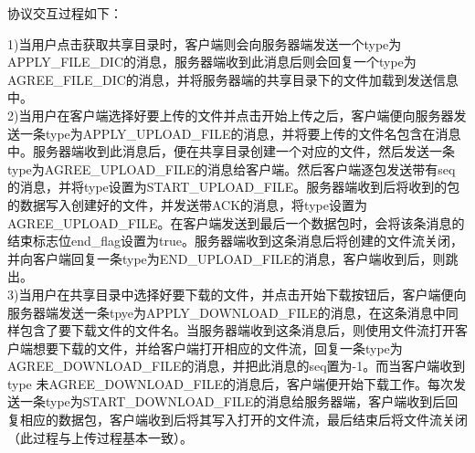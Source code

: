 协议交互过程如下：

\begin{flushleft}
1)当用户点击获取共享目录时，客户端则会向服务器端发送一个type为APPLY\_FILE\_DIC的消息，服务器端收到此消息后则会回复一个type为AGREE\_FILE\_DIC的消息，并将服务器端的共享目录下的文件加载到发送信息中。\\

2)当用户在客户端选择好要上传的文件并点击开始上传之后，客户端便向服务器发送一条type为APPLY\_UPLOAD\_FILE的消息，并将要上传的文件名包含在消息中。服务器端收到此消息后，便在共享目录创建一个对应的文件，然后发送一条type为AGREE\_UPLOAD\_FILE的消息给客户端。然后客户端逐包发送带有seq的消息，并将type设置为START\_UPLOAD\_FILE。服务器端收到后将收到的包的数据写入创建好的文件，并发送带ACK的消息，将type设置为AGREE\_UPLOAD\_FILE。在客户端发送到最后一个数据包时，会将该条消息的结束标志位end\_flag设置为true。服务器端收到这条消息后将创建的文件流关闭，并向客户端回复一条type为END\_UPLOAD\_FILE的消息，客户端收到后，则跳出。\\


3)当用户在共享目录中选择好要下载的文件，并点击开始下载按钮后，客户端便向服务器端发送一条tpye为APPLY\_DOWNLOAD\_FILE的消息，在这条消息中同样包含了要下载文件的文件名。当服务器端收到这条消息后，则使用文件流打开客户端想要下载的文件，并给客户端打开相应的文件流，回复一条type为AGREE\_DOWNLOAD\_FILE的消息，并把此消息的seq置为-1。而当客户端收到type 未AGREE\_DOWNLOAD\_FILE的消息后，客户端便开始下载工作。每次发送一条type为START\_DOWNLOAD\_FILE的消息给服务器端，客户端收到后回复相应的数据包，客户端收到后将其写入打开的文件流，最后结束后将文件流关闭（此过程与上传过程基本一致）。



\end{flushleft}

\clearpage






























